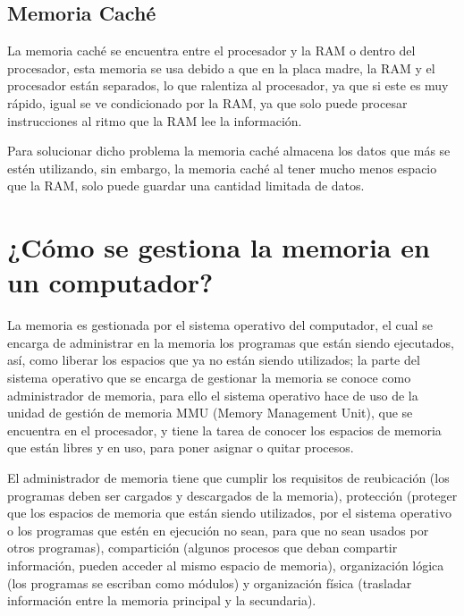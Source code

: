 \documentclass{article}
\begin{document}
\subsection{Memoria Caché}
La memoria caché se encuentra entre el procesador y la RAM o dentro del procesador, esta memoria se usa debido a que en la placa madre, la RAM y el procesador están separados, lo que ralentiza al procesador, ya que si este es muy rápido, igual se ve condicionado por la RAM, ya que solo puede procesar instrucciones al ritmo que la RAM lee la información.
\vspace{0.5cm}

Para solucionar dicho problema la memoria caché almacena los datos que más se estén utilizando, sin embargo, la memoria caché al tener mucho menos espacio que la RAM, solo puede guardar una cantidad limitada de datos.\cite{Salazar}

\section{¿Cómo se gestiona la memoria en un computador?}
La memoria es gestionada por el sistema operativo del computador, el cual se encarga de administrar en la memoria los programas que están siendo ejecutados, así, como liberar los espacios que ya no están siendo utilizados; la parte del sistema operativo que se encarga de gestionar la memoria se conoce como administrador de memoria, para ello el sistema operativo hace de uso de la unidad de gestión de memoria MMU (Memory Management Unit), que se encuentra en el procesador, y tiene la tarea de conocer los espacios de memoria que están libres y en uso, para poner asignar o quitar procesos.\cite{gonzalez2019gestion}
\vspace{0.5cm}

El administrador de memoria tiene que cumplir los requisitos de reubicación (los programas deben ser cargados y descargados de la memoria), protección (proteger que los espacios de memoria que están siendo utilizados, por el sistema operativo o los programas que estén en ejecución no sean, para que no sean usados por otros programas), compartición (algunos procesos que deban compartir información, pueden acceder al mismo espacio de memoria), organización lógica (los programas se escriban como módulos) y organización física (trasladar información entre la memoria principal y la secundaria).\cite{aguilera2015sistemas}
\vspace{0.5cm}
\end{document}
